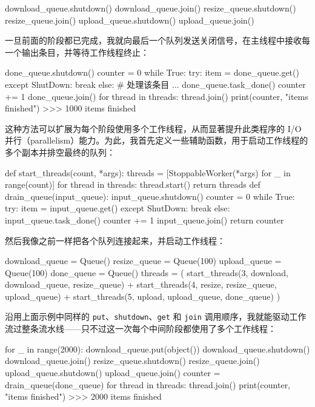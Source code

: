 \begin{codebox}[python]
download_queue.shutdown()
download_queue.join()
resize_queue.shutdown()
resize_queue.join()
upload_queue.shutdown()
upload_queue.join()
\end{codebox}

一旦前面的阶段都已完成，我就向最后一个队列发送关闭信号，在主线程中接收每一个输出条目，并等待工作线程终止：

\begin{codebox}[python]
done_queue.shutdown()
counter = 0
while True:
    try:
        item = done_queue.get()
    except ShutDown:
        break
    else:
        # 处理该条目
        ...
        done_queue.task_done()
        counter += 1
done_queue.join()
for thread in threads:
    thread.join()
print(counter, "items finished")
>>>
1000 items finished
\end{codebox}

这种方法可以扩展为每个阶段使用多个工作线程，从而显著提升此类程序的 I/O 并行（parallelism）能力。为此，我首先定义一些辅助函数，用于启动工作线程的多个副本并排空最终的队列：

\begin{codebox}[python]
def start_threads(count, *args):
    threads = [StoppableWorker(*args) for _ in range(count)]
    for thread in threads:
        thread.start()
    return threads
def drain_queue(input_queue):
    input_queue.shutdown()
    counter = 0
    while True:
        try:
            item = input_queue.get()
        except ShutDown:
            break
        else:
            input_queue.task_done()
            counter += 1
    input_queue.join()
    return counter
\end{codebox}

然后我像之前一样把各个队列连接起来，并启动工作线程：

\begin{codebox}[python]
download_queue = Queue()
resize_queue = Queue(100)
upload_queue = Queue(100)
done_queue = Queue()
threads = (
    start_threads(3, download, download_queue, resize_queue)
    + start_threads(4, resize, resize_queue, upload_queue)
    + start_threads(5, upload, upload_queue, done_queue)
)
\end{codebox}

沿用上面示例中同样的 \texttt{put}、\texttt{shutdown}、\texttt{get} 和 \texttt{join} 调用顺序，我就能驱动工作流过整条流水线——只不过这一次每个中间阶段都使用了多个工作线程：

\begin{codebox}[python]
for _ in range(2000):
    download_queue.put(object())
download_queue.shutdown()
download_queue.join()
resize_queue.shutdown()
resize_queue.join()
upload_queue.shutdown()
upload_queue.join()
counter = drain_queue(done_queue)
for thread in threads:
    thread.join()
print(counter, "items finished")
>>>
2000 items finished
\end{codebox}

